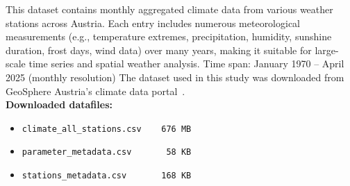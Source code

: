 This dataset contains monthly aggregated climate data from various weather stations across Austria. Each entry includes numerous meteorological measurements (e.g., temperature extremes, precipitation, humidity, sunshine duration, frost days, wind data) over many years, making it suitable for large-scale time series and spatial weather analysis.
Time span: January 1970 – April 2025 (monthly resolution) \linebreak
The dataset used in this study was downloaded from GeoSphere Austria's climate data portal~\cite{geosphere_klima_v2_1m}.\\

\textbf{Downloaded datafiles:} 
\begin{itemize}
    \item \verb|climate_all_stations.csv    676 MB |
    \item \verb|parameter_metadata.csv       58 KB |
    \item \verb|stations_metadata.csv       168 KB |
\end{itemize}